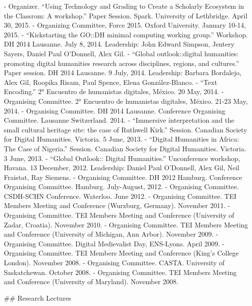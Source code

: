 - Organizer. “Using Technology and Grading to Create a Scholarly Ecosystem in the Classrom: A workshop.” Paper Session. Spark. University of Lethbridge. April 30, 2015.
- Organizing Committee, Force 2015. Oxford University. January 10-14, 2015.
- “Kickstarting the GO::DH minimal computing working group.” Workshop. DH 2014 Lausanne. July 8, 2014. Leadership: John Edward Simpson, Jentery Sayers, Daniel Paul O'Donnell, Alex Gil.
- “Global outlook::digital humanities: promoting digital humanities research across disciplines, regions, and cultures.” Paper session. DH 2014 Lausanne. 9 July, 2014. Leadership: Barbara Bordalejo, Alex Gil, Roopika Risam, Paul Spence, Elena González-Blanco.
- “Text Encoding.” 2° Encuentro de humanistas digitales, México. 20 May, 2014.
- Organising Committee. 2° Encuentro de humanistas digitales, México. 21-23 May, 2014.
- Organising Committee. DH 2014 Lausanne. Conference Organising Committee. Lausanne Switzerland. 2014.
- “Immersive interpretation and the small cultural heritage site: the case of Ruthwell Kirk.” Session. Canadian Society for Digital Humanities. Victoria. 5 June, 2013.
- “Digital Humanities in Africa: The Case of Nigeria.” Session. Canadian Society for Digital Humanities. Victoria. 3 June, 2013.
- “Global Outlook:: Digital Humanities.” Unconference workshop, Havana. 13 December, 2012. Leadership: Daniel Paul O'Donnell, Alex Gil, Neil Fraistat, Ray Siemens.
- Organising Committee. DH 2012 Hamburg. Conference Organising Committee. Hamburg. July-August, 2012.
- Organising Committee. CSDH-SCHN Conference. Waterloo. June 2012.
- Organising Committee. TEI Members Meeting and Conference (Wurzburg, Germany). November 2011.
- Organising Committee. TEI Members Meeting and Conference (University of Zadar, Croatia). November 2010.
- Organising Committee. TEI Members Meeting and Conference (University of Michigan, Ann Arbor). November 2009.
- Organising Committee. Digital Medievalist Day, ENS-Lyons. April 2009.
- Organising Committee. TEI Members Meeting and Conference (King's College London). November 2008.
- Organising Committee. CASTA. University of Saskatchewan. October 2008.
- Organising Committee. TEI Members Meeting and Conference (University of Maryland). November 2008.

\sectionbreak{}
## Research Lectures

